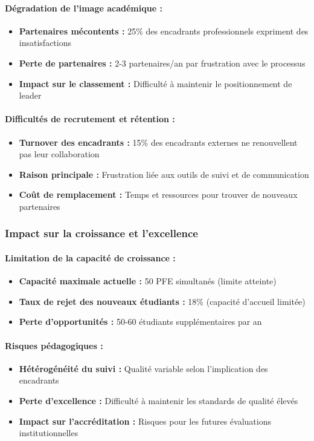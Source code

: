 \paragraph{Dégradation de l'image académique :}
\begin{itemize}
    \item \textbf{Partenaires mécontents :} 25\% des encadrants professionnels expriment des insatisfactions
    \item \textbf{Perte de partenaires :} 2-3 partenaires/an par frustration avec le processus
    \item \textbf{Impact sur le classement :} Difficulté à maintenir le positionnement de leader
\end{itemize}

\paragraph{Difficultés de recrutement et rétention :}
\begin{itemize}
    \item \textbf{Turnover des encadrants :} 15\% des encadrants externes ne renouvellent pas leur collaboration
    \item \textbf{Raison principale :} Frustration liée aux outils de suivi et de communication
    \item \textbf{Coût de remplacement :} Temps et ressources pour trouver de nouveaux partenaires
\end{itemize}

\subsubsection{Impact sur la croissance et l'excellence}

\paragraph{Limitation de la capacité de croissance :}
\begin{itemize}
    \item \textbf{Capacité maximale actuelle :} 50 PFE simultanés (limite atteinte)
    \item \textbf{Taux de rejet des nouveaux étudiants :} 18\% (capacité d'accueil limitée)
    \item \textbf{Perte d'opportunités :} 50-60 étudiants supplémentaires par an
\end{itemize}

\paragraph{Risques pédagogiques :}
\begin{itemize}
    \item \textbf{Hétérogénéité du suivi :} Qualité variable selon l'implication des encadrants
    \item \textbf{Perte d'excellence :} Difficulté à maintenir les standards de qualité élevés
    \item \textbf{Impact sur l'accréditation :} Risques pour les futures évaluations institutionnelles
\end{itemize}

